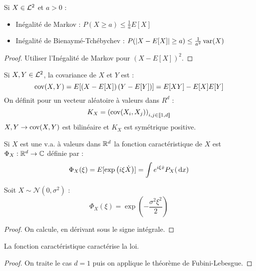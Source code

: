 \documentclass{cours}
\begin{document}
    \begin{proposition}
        Si $X \in \mathcal{L}^{2}$ et $a > 0$ : 
        \begin{itemize}
            \item Inégalité de Markov : $P(X \geq a) \leq \frac{1}{a}E[X]$
            \item Inégalité de Bienaymé-Tchébychev : $P(\left|X - E[X]\right| \geq a) \leq \frac{1}{a^{2}}\operatorname{var}(X)$
        \end{itemize}
    \end{proposition}
    \begin{proof}
        Utiliser l'Inégalité de Markov pour $\left(X - E[X]\right)^{2}$. 
    \end{proof}

    \begin{definition}
        Si $X, Y \in \mathcal{L}^{2}$, la covariance de $X$ et $Y$ est :
        \[
            \operatorname{cov}(X, Y) = E[\left(X - E[X]\right)\left(Y - E[Y]\right)] = E[XY] - E[X]E[Y]
        \]
        On définit pour un vecteur aléatoire à valeurs dans $R^{d}$ : 
        \[
            K_{X} = \left(\operatorname{cov}(X_{i}, X_{j})\right)_{i, j \in \llbracket 1,d\rrbracket}
        \]
        $X, Y \rightarrow \operatorname{cov}(X, Y)$ est bilinéaire et $K_{X}$ est symétrique positive. 
    \end{definition}

    \begin{definition}
        Si $X$ est une v.a. à valeurs dans $\mathbb{R}^{d}$ la fonction caractéristique de $X$ est $\Phi_{X} : \mathbb{R}^{d} \rightarrow \mathbb{C}$ définie par : 
        \[
            \Phi_{X}(\xi) = E[\exp\left(i\xi \dot X\right)] = \int e^{i\xi \dot x}P_{X}({\rm \, d} x)
        \]
    \end{definition}

    \begin{lemma}
        Soit $X \sim \mathcal{N}(0, \sigma^{2})$ : 
        \[
            \Phi_{X}(\xi) = \exp\left(-\frac{\sigma^{2}\xi^{2}}{2}\right)
        \]
    \end{lemma}
    \begin{proof}
        On calcule, en dérivant sous le signe intégrale. 
    \end{proof}

    \begin{theorem}
        La fonction caractéristique caractérise la loi.
    \end{theorem}
    \begin{proof}
        On traite le cas $d = 1$ puis on applique le théorème de Fubini-Lebesgue.
    \end{proof}
\end{document}
